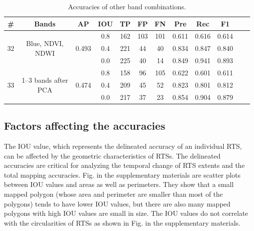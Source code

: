 \documentclass[authoryear,preprint,review,12pt]{elsarticle}
\begin{document}
\begin{table}[ht]
\footnotesize
\caption{Accuracies of other band combinations.}
\label{table_acc_otherbands}
\begin{tabular}{c c c c  c ccc c c c c}
\toprule
\textbf{\#}&\textbf{Bands}&\textbf{AP}&\textbf{IOU}&\textbf{TP}&\textbf{FP}&\textbf{FN}&\textbf{Pre}&\textbf{Rec}&\textbf{F1}\\
\midrule

\multirow{3}{*}{32} &  \multirow{3}{3cm}{Blue, NDVI, NDWI} & \multirow{3}{*}{0.493}  &0.8&162   & 103   & 101   & 0.611  & 0.616  & 0.614   \\
 &  &  &0.4&221   & 44    & 40    & 0.834  & 0.847  & 0.840 \\
 &  &  &0.0&225   & 40    & 14    & 0.849  & 0.941  & 0.893   \\
 
\midrule

\multirow{3}{*}{33} &  \multirow{3}{3cm}{1--3 bands after PCA} & \multirow{3}{*}{0.474} &0.8& 158   & 96    & 105   & 0.622  & 0.601  & 0.611  \\
 &  &  &0.4& 209   & 45    & 52    & 0.823  & 0.801  & 0.812  \\
 &  & &0.0& 217   & 37    & 23    & 0.854  & 0.904  & 0.879  \\

\bottomrule
\end{tabular}

\end{table}



\subsection{Factors affecting the accuracies}
\label{subsec_acc_factors}

The IOU value, which represents the delineated accuracy of an individual RTS, can be affected by the geometric characteristics of RTSs.
The delineated accuracies are critical for analyzing the temporal change of RTS extents and the total mapping accuracies.
Fig.  in the supplementary materials are scatter plots between IOU values and areas as well as perimeters. They show that a small mapped polygon (whose area and perimeter are smaller than most of the polygons) tends to have lower IOU values, but there are also many mapped polygons with high IOU values are small in size. 
The IOU values do not correlate with the circularities of RTSs as shown in Fig.  in the supplementary materials. 
\end{document}
